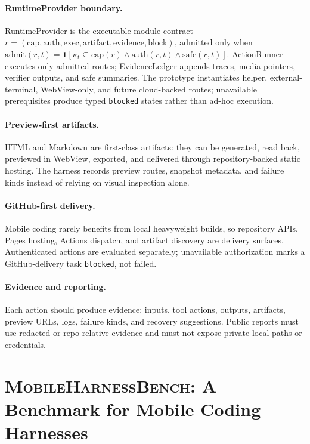 \documentclass{article}
\newcommand{\mhb}{\textsc{MobileHarnessBench}}
\begin{document}
\paragraph{RuntimeProvider boundary.}
RuntimeProvider is the executable module contract \(r=(\mathrm{cap},\mathrm{auth},\mathrm{exec},\mathrm{artifact},\mathrm{evidence},\mathrm{block})\), admitted only when \(\mathrm{admit}(r,t)=\mathbf{1}[\kappa_t\subseteq\mathrm{cap}(r)\land\mathrm{auth}(r,t)\land\mathrm{safe}(r,t)]\).
ActionRunner executes only admitted routes; EvidenceLedger appends traces, media pointers, verifier outputs, and safe summaries.
The prototype instantiates helper, external-terminal, WebView-only, and future cloud-backed routes; unavailable prerequisites produce typed \texttt{blocked} states rather than ad-hoc execution.

\paragraph{Preview-first artifacts.}
HTML and Markdown are first-class artifacts: they can be generated, read back, previewed in WebView, exported, and delivered through repository-backed static hosting.
The harness records preview routes, snapshot metadata, and failure kinds instead of relying on visual inspection alone.

\paragraph{GitHub-first delivery.}
Mobile coding rarely benefits from local heavyweight builds, so repository APIs, Pages hosting, Actions dispatch, and artifact discovery are delivery surfaces.
Authenticated actions are evaluated separately; unavailable authorization marks a GitHub-delivery task \texttt{blocked}, not failed.

\paragraph{Evidence and reporting.}
Each action should produce evidence: inputs, tool actions, outputs, artifacts, preview URLs, logs, failure kinds, and recovery suggestions.
Public reports must use redacted or repo-relative evidence and must not expose private local paths or credentials.

\section{\mhb: A Benchmark for Mobile Coding Harnesses}
\end{document}

